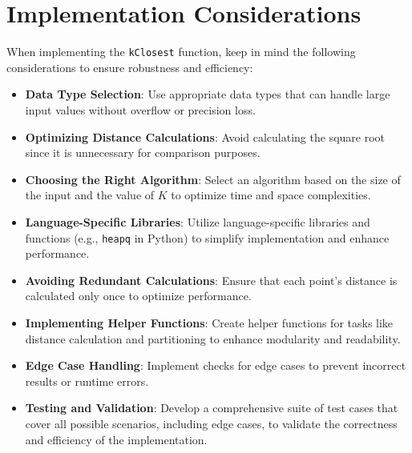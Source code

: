 \section*{Implementation Considerations}

When implementing the \texttt{kClosest} function, keep in mind the following considerations to ensure robustness and efficiency:

\begin{itemize}
    \item \textbf{Data Type Selection}: Use appropriate data types that can handle large input values without overflow or precision loss.
    
    \item \textbf{Optimizing Distance Calculations}: Avoid calculating the square root since it is unnecessary for comparison purposes.
    
    \item \textbf{Choosing the Right Algorithm}: Select an algorithm based on the size of the input and the value of \(K\) to optimize time and space complexities.
    
    \item \textbf{Language-Specific Libraries}: Utilize language-specific libraries and functions (e.g., \texttt{heapq} in Python) to simplify implementation and enhance performance.
    
    \item \textbf{Avoiding Redundant Calculations}: Ensure that each point's distance is calculated only once to optimize performance.
    
    \item \textbf{Implementing Helper Functions}: Create helper functions for tasks like distance calculation and partitioning to enhance modularity and readability.
    
    \item \textbf{Edge Case Handling}: Implement checks for edge cases to prevent incorrect results or runtime errors.
    
    \item \textbf{Testing and Validation}: Develop a comprehensive suite of test cases that cover all possible scenarios, including edge cases, to validate the correctness and efficiency of the implementation.
    

\end{itemize}
